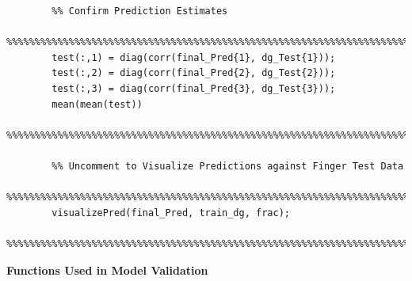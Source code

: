 \documentclass{article}
\begin{document}
\begin{lstlisting}
		%% Confirm Prediction Estimates
		%%%%%%%%%%%%%%%%%%%%%%%%%%%%%%%%%%%%%%%%%%%%%%%%%%%%%%%%%%%%%%%%%%%%%%%%%%%
		test(:,1) = diag(corr(final_Pred{1}, dg_Test{1}));
		test(:,2) = diag(corr(final_Pred{2}, dg_Test{2}));
		test(:,3) = diag(corr(final_Pred{3}, dg_Test{3})); 
		mean(mean(test))
		%%%%%%%%%%%%%%%%%%%%%%%%%%%%%%%%%%%%%%%%%%%%%%%%%%%%%%%%%%%%%%%%%%%%%%%%%%%

		%% Uncomment to Visualize Predictions against Finger Test Data
		%%%%%%%%%%%%%%%%%%%%%%%%%%%%%%%%%%%%%%%%%%%%%%%%%%%%%%%%%%%%%%%%%%%%%%%%%%%
		visualizePred(final_Pred, train_dg, frac);
		%%%%%%%%%%%%%%%%%%%%%%%%%%%%%%%%%%%%%%%%%%%%%%%%%%%%%%%%%%%%%%%%%%%%%%%%%%%
	\end{lstlisting}

	\textbf{Functions Used in Model Validation}\\
\end{document}
